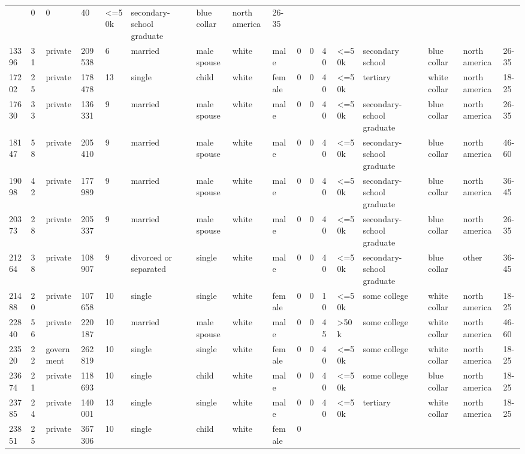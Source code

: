 \documentclass[
  letterpaper,
  DIV=11,
  numbers=noendperiod]{scrartcl}
\begin{document}
\begin{longtable}[]{@{}lllllllllllllllll@{}}
& 0 & 0 & 40 & \textless=50k & secondary-school graduate & blue collar &
north america & 26-35 \\
13396 & 31 & private & 209538 & 6 & married & male spouse & white & male
& 0 & 0 & 40 & \textless=50k & secondary school & blue collar & north
america & 26-35 \\
17202 & 25 & private & 178478 & 13 & single & child & white & female & 0
& 0 & 40 & \textless=50k & tertiary & white collar & north america &
18-25 \\
17630 & 33 & private & 136331 & 9 & married & male spouse & white & male
& 0 & 0 & 40 & \textless=50k & secondary-school graduate & blue collar &
north america & 26-35 \\
18147 & 58 & private & 205410 & 9 & married & male spouse & white & male
& 0 & 0 & 40 & \textless=50k & secondary-school graduate & blue collar &
north america & 46-60 \\
19098 & 42 & private & 177989 & 9 & married & male spouse & white & male
& 0 & 0 & 40 & \textless=50k & secondary-school graduate & blue collar &
north america & 36-45 \\
20373 & 28 & private & 205337 & 9 & married & male spouse & white & male
& 0 & 0 & 40 & \textless=50k & secondary-school graduate & blue collar &
north america & 26-35 \\
21264 & 38 & private & 108907 & 9 & divorced or separated & single &
white & male & 0 & 0 & 40 & \textless=50k & secondary-school graduate &
blue collar & other & 36-45 \\
21488 & 20 & private & 107658 & 10 & single & single & white & female &
0 & 0 & 10 & \textless=50k & some college & white collar & north america
& 18-25 \\
22840 & 56 & private & 220187 & 10 & married & male spouse & white &
male & 0 & 0 & 45 & \textgreater50k & some college & white collar &
north america & 46-60 \\
23520 & 22 & government & 262819 & 10 & single & single & white & female
& 0 & 0 & 40 & \textless=50k & some college & white collar & north
america & 18-25 \\
23674 & 21 & private & 118693 & 10 & single & child & white & male & 0 &
0 & 40 & \textless=50k & some college & blue collar & north america &
18-25 \\
23785 & 24 & private & 140001 & 13 & single & single & white & male & 0
& 0 & 40 & \textless=50k & tertiary & white collar & north america &
18-25 \\
23851 & 25 & private & 367306 & 10 & single & child & white & female & 0

\end{longtable}
\end{document}
